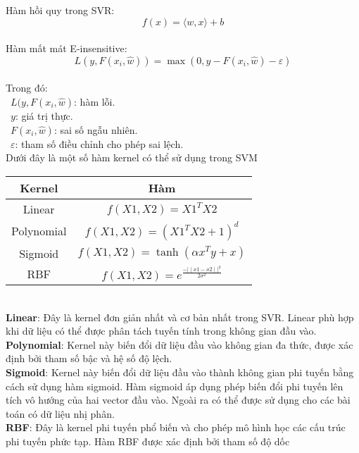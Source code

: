 Hàm hồi quy trong SVR:
\[
f(x) = \langle w, x \rangle + b
\]\\
Hàm mất mát E-insensitive:
\[
L(y, F(x_i, \hat{w})) = \max(0, y - F(x_i, \hat{w}) - \varepsilon)
\]\\
Trong đó:\\
    \indent\textbullet\ \(L(y,F(x_i,\hat{w})\): hàm lỗi.\\
    \indent\textbullet\ \(y\): giá trị thực.\\
    \indent\textbullet\ \(F(x_i,\hat{w})\): sai số ngẫu nhiên.\\
    \indent\textbullet\ \(\varepsilon\): tham số điều chỉnh cho phép sai lệch.\\
Dưới đây là một số hàm kernel có thể sử dụng trong SVM
\begin{table}[htbp]
  \centering
\begin{tabular}{|c|c|}
    \hline
     Kernel& Hàm\\ \hline
     Linear &  $f(X1,X2)=X1^TX2$\\ \hline
     Polynomial & $f(X1,X2)=(X1^TX2 +1)^d$ \\ \hline
     Sigmoid &  $f(X1,X2)=\tanh(\alpha x^{T}y+x)$\\ \hline
     RBF &  $f(X1,X2)=e^{\frac{-{\mid\mid x1-x2 \mid\mid}^2}{2\sigma^2}}$\\ \hline
\end{tabular}
\end{table}\\
\textbf{Linear}: Đây là kernel đơn giản nhất và cơ bản nhất trong SVR. Linear phù hợp khi dữ liệu có thể được phân tách tuyến tính trong không gian đầu vào.\\
\textbf{Polynomial}: Kernel này biến đổi dữ liệu đầu vào không gian đa thức, được xác định bởi tham số bậc và hệ số độ lệch.\\
\textbf{Sigmoid}: Kernel này biến đổi dữ liệu đầu vào thành không gian phi tuyến bằng cách sử dụng hàm sigmoid. Hàm sigmoid áp dụng phép biến đổi phi tuyến lên tích vô hướng của hai vector đầu vào. Ngoài ra có thể được sử dụng cho các bài toán có dữ liệu nhị phân.\\
\textbf{RBF}: Đây là kernel phi tuyến phổ biến và cho phép mô hình học các cấu trúc phi tuyến phức tạp. Hàm RBF được xác định bởi tham số độ dốc\\